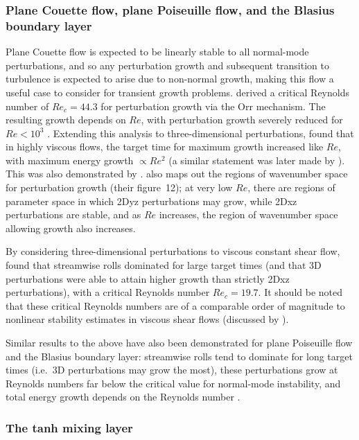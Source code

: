 \documentclass{article}
\begin{document}
\subsubsection{Plane Couette flow, plane Poiseuille flow, and the Blasius boundary layer}

Plane Couette flow is expected to be linearly stable to all normal-mode perturbations, and so any perturbation growth and subsequent transition to turbulence is expected to arise due to non-normal growth, making this flow a useful case to consider for transient growth problems. \citet{Orr1907b} derived a critical Reynolds number of $Re_c=44.3$ for perturbation growth via the Orr mechanism. The resulting growth depends on $Re$, with perturbation growth severely reduced for $Re<10^3$ \citep{Farrell1988}. Extending this analysis to three-dimensional perturbations, \citet{Butler1992} found that in highly viscous flows, the target time for maximum growth increased like $Re$, with maximum energy growth $\propto Re^2$ (a similar statement was later made by \citet{Bakas2001}). This was also demonstrated by \citet{Trefethen1993}. \citet{Butler1992} also maps out the regions of wavenumber space for perturbation growth (their figure~12); at very low $Re$, there are regions of parameter space in which 2Dyz perturbations may grow, while 2Dxz perturbations are stable, and as $Re$ increases, the region of wavenumber space allowing growth also increases. 

By considering three-dimensional perturbations to viscous constant shear flow, \citet{Farrell1993a} found that streamwise rolls dominated for large target times (and that 3D perturbations were able to attain higher growth than strictly 2Dxz perturbations), with a critical Reynolds number $Re_c=19.7$. It should be noted that these critical Reynolds numbers are of a comparable order of magnitude to nonlinear stability estimates in viscous shear flows (discussed by \citet{Farrell1993a}). 

Similar results to the above have also been demonstrated for plane Poiseuille flow and the Blasius boundary layer: streamwise rolls tend to dominate for long target times (i.e.~3D perturbations may grow the most), these perturbations grow at Reynolds numbers far below the critical value for normal-mode instability, and total energy growth depends on the Reynolds number \citep{Butler1992,Trefethen1993}.

\subsubsection{The tanh mixing layer}
\end{document}
